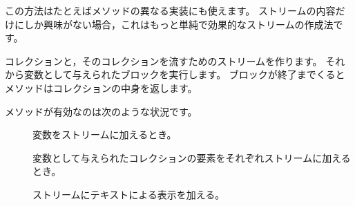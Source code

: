\documentclass[a4paper,10pt,twoside]{book}
\begin{document}
この方法はたとえばメソッドの異なる実装にも使えます。
ストリームの内容だけにしか興味がない場合，これはもっと単純で効果的なストリームの作成法です。


コレクションと，そのコレクションを流すためのストリームを作ります。
それから変数として与えられたブロックを実行します。
ブロックが終了までくるとメソッドはコレクションの中身を返します。


メソッドが有効なのは次のような状況です。

\begin{description}

\item[] 変数をストリームに加えるとき。
\item[] 変数として与えられたコレクションの要素をそれぞれストリームに加えるとき。
\item[] ストリームにテキストによる表示を加える。
\end{description}
\end{document}
